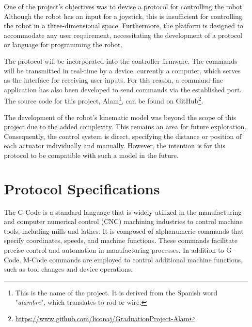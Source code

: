 One of the project's objectives was to devise a protocol for controlling the robot. Although the robot has an input for a joystick, this is insufficient for controlling the robot in a three-dimensional space. Furthermore, the platform is designed to accommodate any user requirement, necessitating the development of a protocol or language for programming the robot.

The protocol will be incorporated into the controller firmware. The commands will be transmitted in real-time by a device, currently a computer, which serves as the interface for receiving user inputs. For this reason, a command-line application has also been developed to send commands via the established port. The source code for this project, Alam\footnote{This is the name of the project. It is derived from the Spanish word "\textit{alambre}", which translates to rod or wire.}, can be found on GitHub\footnote{\url{https://www.github.com/liconaj/GraduationProject-Alam}}.

The development of the robot's kinematic model was beyond the scope of this project due to the added complexity. This remains an area for future exploration. Consequently, the control system is direct, specifying the distance or position of each actuator individually and manually. However, the intention is for this protocol to be compatible with such a model in the future.

\section{Protocol Specifications}

The G-Code is a standard language that is widely utilized in the manufacturing and computer numerical control (CNC) machining industries to control machine tools, including mills and lathes. It is composed of alphanumeric commands that specify coordinates, speeds, and machine functions. These commands facilitate precise control and automation in manufacturing processes. In addition to G-Code, M-Code commands are employed to control additional machine functions, such as tool changes and device operations.

